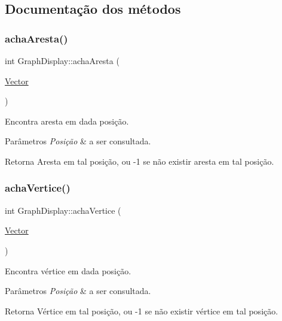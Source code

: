 \subsection{Documentação dos métodos}
\mbox{\label{classGraphDisplay_ad14587ecf7f118cf8d071231de2e5809}} 
\subsubsection{\texorpdfstring{achaAresta()}{achaAresta()}}
{\footnotesize\ttfamily int Graph\+Display\+::acha\+Aresta (\begin{DoxyParamCaption}\item[{\mbox{\hyperlink{classVector}{Vector}}}]{ }\end{DoxyParamCaption})}

Encontra aresta em dada posição. 
\begin{DoxyParams}{Parâmetros}
{\em Posição} & a ser consultada. \\
\hline
\end{DoxyParams}
\begin{DoxyReturn}{Retorna}
Aresta em tal posição, ou -\/1 se não existir aresta em tal posição. 
\end{DoxyReturn}
\mbox{\label{classGraphDisplay_a8a07eca019e47afd54a207dc66195b3f}} 
\subsubsection{\texorpdfstring{achaVertice()}{achaVertice()}}
{\footnotesize\ttfamily int Graph\+Display\+::acha\+Vertice (\begin{DoxyParamCaption}\item[{\mbox{\hyperlink{classVector}{Vector}}}]{ }\end{DoxyParamCaption})}

Encontra vértice em dada posição. 
\begin{DoxyParams}{Parâmetros}
{\em Posição} & a ser consultada. \\
\hline
\end{DoxyParams}
\begin{DoxyReturn}{Retorna}
Vértice em tal posição, ou -\/1 se não existir vértice em tal posição. 
\end{DoxyReturn}
\mbox{\label{classGraphDisplay_a77ab2c4ae2c7facff5034e140e43ed73}} 

